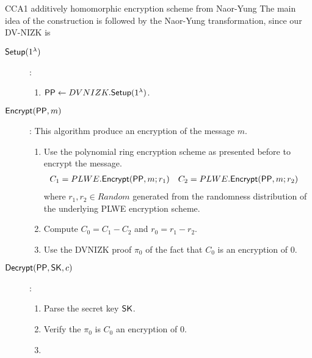 \begin{section}{CCA1 additively homomorphic encryption scheme from Naor-Yung}
  The main idea of the construction is followed by the Naor-Yung transformation,
  since our DV-NIZK is
  \begin{description}
    \item [${\mathsf{Setup}}(1^\lambda)$]:
    \begin{enumerate}
      \item ${\mathsf{PP}} \gets DVNIZK.{\mathsf{Setup}}(1^\lambda)$.
    \end{enumerate}
    \item[${\mathsf{Encrypt}}({\mathsf{PP}}, m)$]: This algorithm produce an encryption of the message $m$.
    \begin{enumerate}
      \item Use the polynomial ring encryption scheme as presented before to encrypt the message.
      \begin{align*}
        C_1 &= PLWE.{\mathsf{Encrypt}}({\mathsf{PP}}, m; r_1) & C_2 &= PLWE.{\mathsf{Encrypt}}({\mathsf{PP}}, m; r_2)
      \end{align*}
      where $r_1, r_2 \in Random$ generated from the randomness distribution of the underlying PLWE encryption scheme.
      \item Compute $C_0 = C_1 - C_2$ and $r_0 = r_1 - r_2$.
      \item Use the DVNIZK proof $\pi_0$ of the fact that $C_0$ is an encryption of $0$.
    \end{enumerate}
    \item[${\mathsf{Decrypt}}({\mathsf{PP}}, \mathsf{SK}, c)$]:
    \begin{enumerate}
      \item Parse the secret key $\mathsf{SK}$.
      \item Verify the $\pi_0$ is $C_0$ an encryption of $0$.
      \item
    \end{enumerate}
  \end{description}

  \begin{subsection}{}


  \end{subsection}
\end{section}
